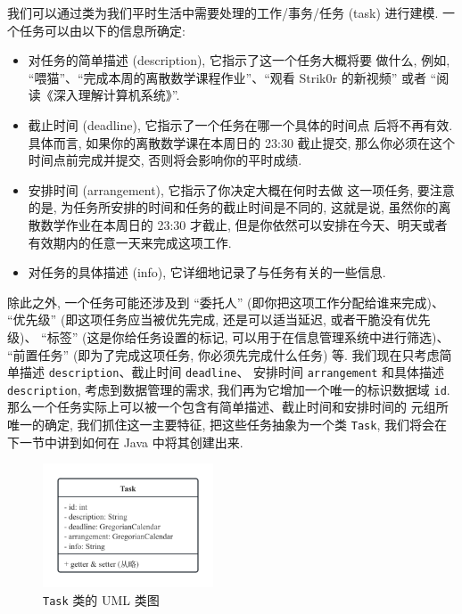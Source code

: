 \documentclass[10pt,UTF8]{book} %
\begin{document}
我们可以通过类为我们平时生活中需要处理的工作/事务/任务 (task) 进行建模. 
一个任务可以由以下的信息所确定:
\begin{itemize}[itemsep=0pt]
    \item 对任务的简单描述 (description), 它指示了这一个任务大概将要
    做什么, 例如, “喂猫”、“完成本周的离散数学课程作业”、“观看 Strik0r 的新视频”
    或者 “阅读《深入理解计算机系统》”.
    \item 截止时间 (deadline), 它指示了一个任务在哪一个具体的时间点
    后将不再有效. 具体而言, 如果你的离散数学课在本周日的 23:30 截止提交,
    那么你必须在这个时间点前完成并提交, 否则将会影响你的平时成绩.
    \item 安排时间 (arrangement), 它指示了你决定大概在何时去做
    这一项任务, 要注意的是, 为任务所安排的时间和任务的截止时间是不同的,
    这就是说, 虽然你的离散数学作业在本周日的 23:30 才截止,
    但是你依然可以安排在今天、明天或者有效期内的任意一天来完成这项工作.
    \item 对任务的具体描述 (info), 它详细地记录了与任务有关的一些信息.
\end{itemize}
除此之外, 一个任务可能还涉及到 “委托人” (即你把这项工作分配给谁来完成)、
“优先级” (即这项任务应当被优先完成, 还是可以适当延迟, 或者干脆没有优先级)、
“标签” (这是你给任务设置的标记, 可以用于在信息管理系统中进行筛选)、
“前置任务” (即为了完成这项任务, 你必须先完成什么任务) 等.
我们现在只考虑简单描述 \lstinline|description|、截止时间 \lstinline|deadline|、
安排时间 \lstinline|arrangement| 和具体描述 \lstinline|description|,
考虑到数据管理的需求, 我们再为它增加一个唯一的标识数据域 \lstinline|id|.
那么一个任务实际上可以被一个包含有简单描述、截止时间和安排时间的
元组所唯一的确定, 我们抓住这一主要特征, 把这些任务抽象为一个类 \lstinline|Task|,
我们将会在下一节中讲到如何在 Java 中将其创建出来.

\begin{figure}[H]
    \centering
    \includegraphics*[width=0.45\textwidth]{pic/UML/Task.png}
    \caption{\lstinline|Task| 类的 UML 类图}
    \label{uml:class TaskManagement.Task}
\end{figure}
\end{document}
